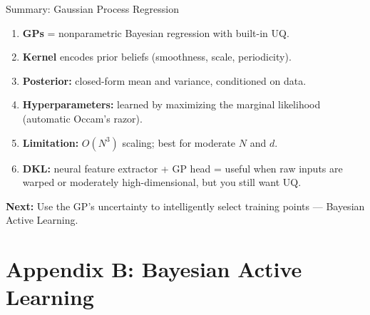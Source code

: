 \documentclass[aspectratio=169,11pt]{beamer}
\newcommand{\emphc}[1]{\textcolor{harvardcrimson}{#1}}
\begin{document}
\begin{frame}{Summary: Gaussian Process Regression}
\begin{enumerate}
  \item \textbf{GPs} = nonparametric Bayesian regression with \emphc{built-in UQ}.
  \item \textbf{Kernel} encodes prior beliefs (smoothness, scale, periodicity).
  \item \textbf{Posterior:} closed-form mean and variance, conditioned on data.
  \item \textbf{Hyperparameters:} learned by maximizing the marginal likelihood (automatic Occam's razor).
  \item \textbf{Limitation:} $O(N^3)$ scaling; best for moderate $N$ and $d$.
  \item \textbf{DKL:} neural feature extractor + GP head = useful when raw inputs are warped or moderately high-dimensional, but you still want UQ.
\end{enumerate}

\vspace{0.3cm}
\textbf{Next:} Use the GP's uncertainty to \emphc{intelligently select training points} --- Bayesian Active Learning.
\end{frame}

\section{Appendix B: Bayesian Active Learning}
\end{document}
